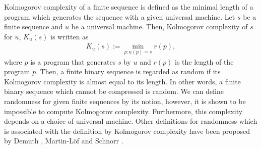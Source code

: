 Kolmogorov complexity of a finite sequence is defined as the minimal length of a program which generates the sequence with a given universal machine. Let $s$ be a finite sequence and $u$ be a universal machine. Then, Kolmogorov complexity of $s$ for $u$, $K_u(s)$ is written as 
\begin{align}
	K_u(s):= \min_{p:u(p)=s} r(p),	
\end{align}
where $p$ is a program that generates $s$ by $u$ and $r (p)$ is the length of the program $p$. 
%
Then, a finite binary sequence is regarded as random if its Kolmogorov complexity is almost equal to its length. In other words, a finite binary sequence which cannot be compressed is random. 
%
We can define randomness for given finite sequences by its notion, however, it is shown to be impossible to compute Kolmogorov complexity. Furthermore, this complexity depends on a choice of universal machine.
Other definitions for randomness which is associated with the definition by Kolmogorov complexity have been proposed by Demuth \cite{demuth1988remarks}, Martin-L\"{o}f \cite{martin1966definition,martin1971complexity} and Schnorr \cite{schnorr1971unified,schnorr1973process,schnorr1977general}.
%
%
%
